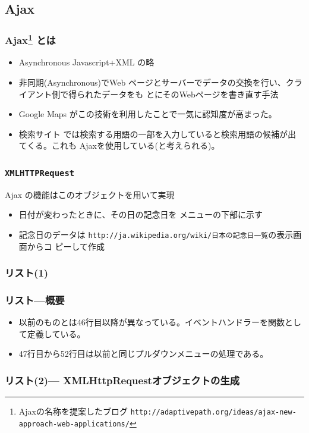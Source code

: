 \subsection{Ajax}
\begin{frame}[containsverbatim]
\frametitle{Ajax\footnote{Ajaxの名称を提案したブログ
 \texttt{http://adaptivepath.org/ideas/ajax-new-approach-web-applications/}}
 とは}
\begin{itemize}
 \item Asynchronous Javascript+XML の略
 \item 非同期(Asynchronous)でWeb
ページとサーバーでデータの交換を行い、クライアント側で得られたデータをも
とにそのWebページを書き直す手法
\end{itemize} 

\begin{itemize}
 \item Google Maps がこの技術を利用したことで一気に認知度が高まった。
 \item 検索サイト
では検索する用語の一部を入力していると検索用語の候補が出てくる。これも
Ajaxを使用している(と考えられる)。
\end{itemize}
\end{frame}
\begin{frame}[containsverbatim]
\frametitle{\texttt{XMLHTTPRequest}}
Ajax の機能はこのオブジェクトを用いて実現

\begin{itemize}
 \item 日付が変わったときに、その日の記念日を
 メニューの下部に示す
 \item 記念日のデータは
 \texttt{http://ja.wikipedia.org/wiki/日本の記念日一覧}の表示画面からコ
 ピーして作成
\end{itemize}
\end{frame}
\begin{frame}[containsverbatim]
\frametitle{リスト(1)}
\end{frame}
\begin{frame}[containsverbatim]
\frametitle{リスト---概要}
\begin{itemize}
 \item 以前のものとは46行目以降が異なっている。イベントハンドラーを関数とし
       て定義している。
 \item 47行目から52行目は以前と同じプルダウンメニューの処理である。
\end{itemize}
\end{frame}
\begin{frame}[containsverbatim]
\frametitle{リスト(2)--- XMLHttpRequestオブジェクトの生成}
\end{frame}
